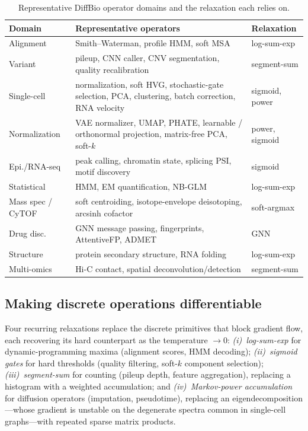 \documentclass[10pt,twocolumn]{article}
\begin{document}
\begin{table}[t]
\centering\small
\caption{Representative DiffBio operator domains and the relaxation each relies on.}
\label{tab:catalog}
\begin{tabular}{@{}p{1.75cm}p{4.35cm}p{1.15cm}@{}}
\toprule
Domain & Representative operators & Relaxation \\
\midrule
Alignment & Smith--Waterman, profile HMM, soft MSA & log-sum-exp \\
Variant & pileup, CNN caller, CNV segmentation, quality recalibration & segment-sum \\
Single-cell & normalization, soft HVG, stochastic-gate selection, PCA, clustering, batch correction, RNA velocity & sigmoid, power \\
Normalization & VAE normalizer, UMAP, PHATE, learnable / orthonormal projection, matrix-free PCA, soft-$k$ & power, sigmoid \\
Epi./RNA-seq & peak calling, chromatin state, splicing PSI, motif discovery & sigmoid \\
Statistical & HMM, EM quantification, NB-GLM & log-sum-exp \\
Mass spec / CyTOF & soft centroiding, isotope-envelope deisotoping, arcsinh cofactor & soft-argmax \\
Drug disc. & GNN message passing, fingerprints, AttentiveFP, ADMET & GNN \\
Structure & protein secondary structure, RNA folding & log-sum-exp \\
Multi-omics & Hi-C contact, spatial deconvolution/detection & segment-sum \\
\bottomrule
\end{tabular}
\end{table}

\subsection{Making discrete operations differentiable}

Four recurring relaxations replace the discrete primitives that block gradient flow, each
recovering its hard counterpart as the temperature $\to 0$: \emph{(i)~log-sum-exp} for
dynamic-programming maxima (alignment scores, HMM decoding); \emph{(ii)~sigmoid gates} for
hard thresholds (quality filtering, soft-$k$ component selection); \emph{(iii)~segment-sum}
for counting (pileup depth, feature aggregation), replacing a histogram with a weighted
accumulation; and \emph{(iv)~Markov-power accumulation} for diffusion operators (imputation,
pseudotime), replacing an eigendecomposition---whose gradient is unstable on the degenerate
spectra common in single-cell graphs---with repeated sparse matrix products.
\end{document}
